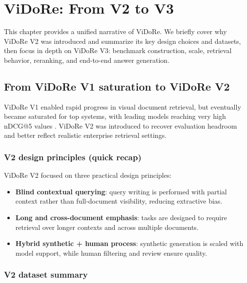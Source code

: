 \setchapterpreamble[u]{\margintoc}
\chapter{ViDoRe: From V2 to V3}

\begin{kaobox}[frametitle=Chapter Overview]
This chapter provides a unified narrative of ViDoRe. We briefly cover why ViDoRe V2 was introduced and summarize its key design choices and datasets, then focus in depth on ViDoRe V3: benchmark construction, scale, retrieval behavior, reranking, and end-to-end answer generation.
\end{kaobox}

\section{From ViDoRe V1 saturation to ViDoRe V2}

ViDoRe V1 enabled rapid progress in visual document retrieval, but eventually became saturated for top systems, with leading models reaching very high nDCG@5 values . ViDoRe V2 was introduced to recover evaluation headroom and better reflect realistic enterprise retrieval settings.

\subsection{V2 design principles (quick recap)}

ViDoRe V2 focused on three practical design principles:
\begin{itemize}
    \item \textbf{Blind contextual querying}: query writing is performed with partial context rather than full-document visibility, reducing extractive bias.
    \item \textbf{Long and cross-document emphasis}: tasks are designed to require retrieval over longer contexts and across multiple documents.
    \item \textbf{Hybrid synthetic + human process}: synthetic generation is scaled with model support, while human filtering and review ensure quality.
\end{itemize}

\subsection{V2 dataset summary}

